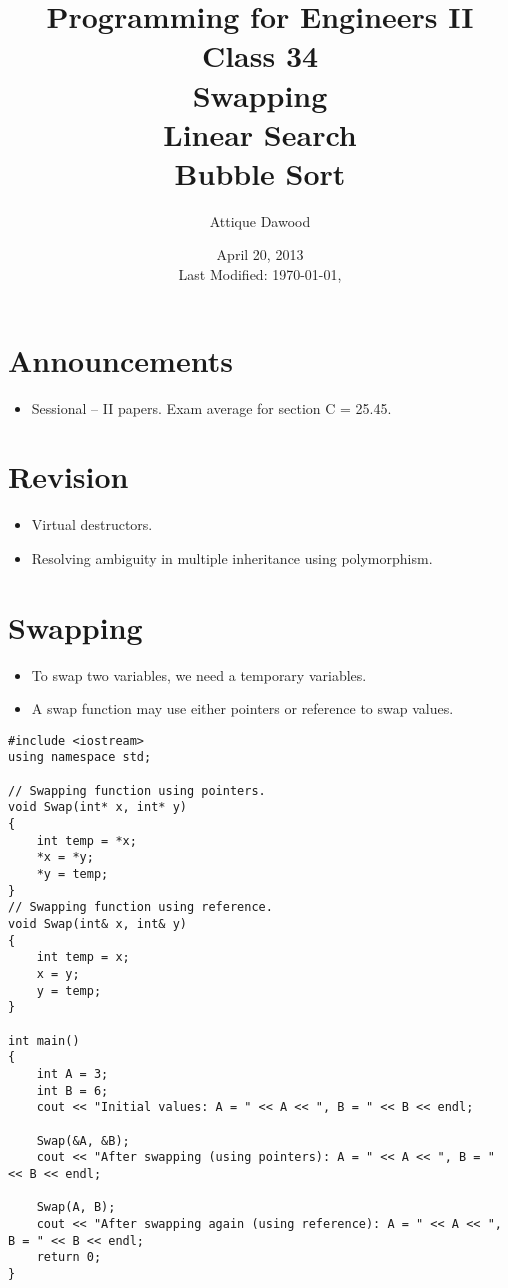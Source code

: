 \documentclass[12pt,a4paper]{article}
\title{\vspace{-2cm}Programming for Engineers II\\Class 34\\Swapping\\Linear Search\\Bubble Sort}
\author{Attique Dawood}
\date{April 20, 2013\\[0.2cm] Last Modified: \today, \currenttime}
\begin{document}
\maketitle
\section{Announcements}
\begin{itemize}
\item Sessional -- II papers. Exam average for section C = 25.45.
\end{itemize}
\section{Revision}
\begin{itemize}
\item Virtual destructors.
\item Resolving ambiguity in multiple inheritance using polymorphism.
\end{itemize}
\section{Swapping}
\begin{itemize}
\item To swap two variables, we need a temporary variables.
\item A swap function may use either pointers or reference to swap values.
\end{itemize}
\begin{lstlisting}[caption={Swapping Functions Using Pointer and Reference},escapechar=$]
#include <iostream>
using namespace std;

// Swapping function using pointers.
void Swap(int* x, int* y)
{
	int temp = *x;
	*x = *y;
	*y = temp;
}
// Swapping function using reference.
void Swap(int& x, int& y)
{
	int temp = x;
	x = y;
	y = temp;
}

int main()
{
	int A = 3;
	int B = 6;
	cout << "Initial values: A = " << A << ", B = " << B << endl;

	Swap(&A, &B);
	cout << "After swapping (using pointers): A = " << A << ", B = " << B << endl;

	Swap(A, B);
	cout << "After swapping again (using reference): A = " << A << ", B = " << B << endl;
	return 0;
}
\end{lstlisting}
\end{document}
